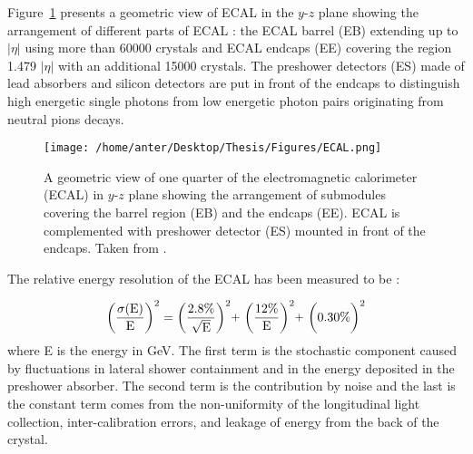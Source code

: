 Figure~\ref{fig:ecal} presents a geometric view of ECAL in the $y$-$z$ plane showing the arrangement of different parts of ECAL 
: the ECAL barrel (EB) extending up to $|\eta|$  using more than 60000 crystals and ECAL endcaps (EE) covering the region 1.479 \ls $|\eta|$  with an additional 15000 crystals. The preshower detectors (ES) made of lead absorbers and silicon detectors are put in front of the endcaps to distinguish high energetic single photons from low energetic photon pairs originating from neutral pions decays.

\begin{figure}[!h]
\begin{center}
\vspace*{3mm} 
\hspace*{-5mm}
\texttt{[image: /home/anter/Desktop/Thesis/Figures/ECAL.png]}\\
\vspace*{2mm}
\caption{A geometric view of one quarter of the electromagnetic calorimeter (ECAL) in $y$-$z$ plane showing the arrangement of submodules covering the barrel region (EB) and the endcaps (EE). ECAL is complemented with preshower detector (ES) mounted in front of the endcaps. Taken from \cite{Bayatian:2006nff}.}
\label{fig:ecal}
\end{center}
\end{figure}

The relative energy resolution of the ECAL has been measured to be \cite{Adzic:2007mi} :

\begin{equation}
{\rm \bigg(\frac{\sigma(E)}{E}\bigg)^2 = \bigg(\frac{2.8\%}{\sqrt{E}}\bigg)^2 \plus \bigg(\frac{12\%}{E}\bigg)^2 \plus \bigg(0.30\%\bigg)^2}
\end{equation}
where E is the energy in GeV. The first term is the stochastic component caused by fluctuations in lateral shower containment and in the energy deposited in the preshower absorber. The second term is the contribution by noise and the last is the constant term comes from the non-uniformity of the longitudinal light collection, inter-calibration errors, and leakage of energy from the back of the crystal.

